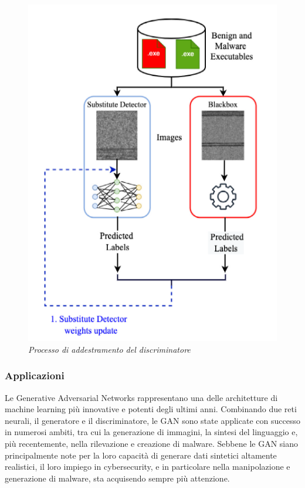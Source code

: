 \begin{figure}[ht]
    \centering
        \centering
        \includegraphics[width=0.6\linewidth]{images/discriminator_train.png}
        \caption{\emph{Processo di addestramento del discriminatore}}
        \label{fig:discriminator_train}
\end{figure}




\subsubsection{Applicazioni}
Le Generative Adversarial Networks rappresentano una delle architetture di machine learning più innovative e potenti degli ultimi anni. Combinando due reti neurali, il generatore e il discriminatore, le GAN sono state applicate con successo in numerosi ambiti, tra cui la generazione di immagini, la sintesi del linguaggio e, più recentemente, nella rilevazione e creazione di malware. Sebbene le GAN siano principalmente note per la loro capacità di generare dati sintetici altamente realistici, il loro impiego in cybersecurity, e in particolare nella manipolazione e generazione di malware, sta acquisendo sempre più attenzione.

